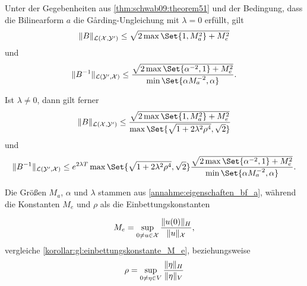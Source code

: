 \begin{Korollar}
\label{thm:schwab09:theorem51:ungleichungen}
    Unter der Gegebenheiten aus \cref{thm:schwab09:theorem51} und der Bedingung, dass die Bilinearform $a$ die G\aa{}rding-Ungleichung mit $\lambda = 0$ erfüllt, gilt
    \begin{equation}
        \norm{B}_{\mathcal L(\mathcal X, \mathcal Y')} \leq \sqrt{2 \max\Set{1, M_{a}^{2}} + M_{e}^{2}}
    \end{equation}
    und
    \begin{equation}
        \norm{B^{-1}}_{\mathcal L(\mathcal Y', \mathcal X)} \leq \frac{\sqrt{2 \max \Set{\alpha^{-2}, 1} + M_{e}^{2}}}{\min\Set{\alpha M_{a}^{-2}, \alpha}}.
    \end{equation}

    Ist $\lambda \neq 0$, dann gilt ferner
    \begin{equation}
        \label{eq:var_all_norm_B}
        \norm{B}_{\mathcal L(\mathcal X, \mathcal Y')} \leq \frac{\sqrt{2\max\Set{1, M_{a}^{2}} + M_{e}^{2}}}{\max\Set{\sqrt{1 + 2 \lambda^{2} \rho^{4}}, \sqrt{2}}}
    \end{equation}
    und
    \begin{equation}
        \label{eq:var_all_norm_B_inv}
        \norm{B^{-1}}_{\mathcal L(\mathcal Y', \mathcal X)} \leq e^{2 \lambda T} \max\Set{\sqrt{1 + 2 \lambda^{2} \rho^{4}}, \sqrt{2}}  \frac{\sqrt{2 \max\Set{ \alpha^{-2}, 1} + M_{e}^{2}}}{\min\Set{\alpha M_{a}^{-2}, \alpha}}.
    \end{equation}

    Die Größen $M_{a}$, $\alpha$ und $\lambda$ stammen aus \cref{annahme:eigenschaften_bf_a},
    während die Konstanten $M_{e}$ und $\rho$ als die Einbettungskonstanten

    \begin{equation}
        \label{eq:var_all_M_e}
        M_{e} = \sup_{0 \neq u \in \mathcal X} \frac{\lVert u(0)\rVert_{H}}{\lVert u\rVert_{\mathcal X}},
    \end{equation}
    vergleiche \cref{korollar:gl:einbettungskonstante_M_e}, beziehungsweise
    \begin{equation}
        \label{eq:var_all_rho}
        \rho = \sup_{0 \neq \eta \in V} \frac{\lVert\eta\rVert_{H}}{\lVert\eta\rVert_{V}}
    \end{equation}

    \begin{Beweis}
        $\,$\newline
    \end{Beweis}
\end{Korollar}

